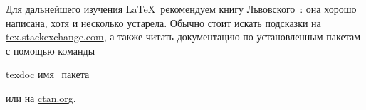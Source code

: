 Для дальнейшего изучения \LaTeX\ рекомендуем книгу Львовского~\autocite{Lvo2003}: она хорошо написана, хотя и несколько устарела.
Обычно стоит искать подсказки на
\href{http://tex.stackexchange.com/}{tex.stackexchange.com}, а также
читать документацию по установленным пакетам с помощью
команды
\begin{Verb}
texdoc имя_пакета
\end{Verb}
или на \href{http://ctan.org/}{ctan.org}.

\printbibliography[heading=bibintoc%
]


